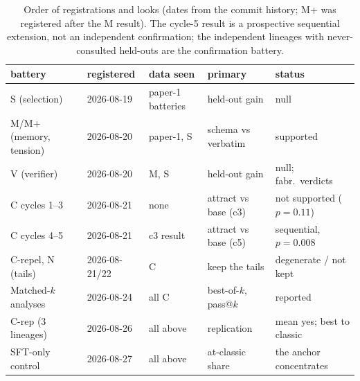 \documentclass[11pt]{article}
\begin{document}
\begin{table}[h]
\centering\footnotesize
\setlength{\tabcolsep}{4pt}
\begin{tabular}{@{}lllll@{}}
\toprule
battery & registered & data seen & primary & status \\
\midrule
S (selection) & 2026-08-19 & paper-1 batteries & held-out gain & null \\
M/M+ (memory, tension) & 2026-08-20 & paper-1, S & schema vs verbatim & supported \\
V (verifier) & 2026-08-20 & M, S & held-out gain & null; fabr.\ verdicts \\
C cycles 1--3 & 2026-08-21 & none & attract vs base (c3) & not supported ($p=0.11$) \\
C cycles 4--5 & 2026-08-21 & c3 result & attract vs base (c5) & sequential, $p=0.008$ \\
C-repel, N (tails) & 2026-08-21/22 & C & keep the tails & degenerate / not kept \\
Matched-$k$ analyses & 2026-08-24 & all C & best-of-$k$, pass@$k$ & reported \\
C-rep (3 lineages) & 2026-08-26 & all above & replication & mean yes; best to classic \\
SFT-only control & 2026-08-27 & all above & at-classic share & the anchor concentrates \\
\bottomrule
\end{tabular}
\caption{Order of registrations and looks (dates from the commit history;
M+ was registered after the M result). The cycle-5 result is a
prospective sequential extension, not an independent confirmation; the
independent lineages with never-consulted held-outs are the confirmation
battery.}
\label{tab:provenance2}
\end{table}
\end{document}
